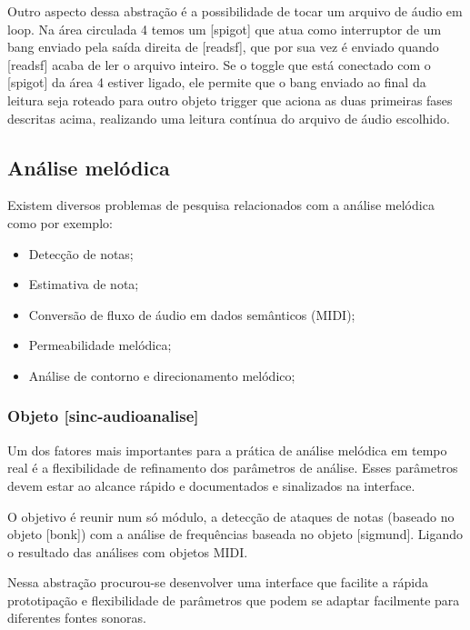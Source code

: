 \documentclass[draft]{ppgmus}
\begin{document}
Outro aspecto dessa abstração é a possibilidade de tocar um arquivo de áudio em loop.
Na área circulada 4 temos um [spigot] que atua como interruptor de um bang enviado pela
saída direita de [readsf\texttildelow], que por sua vez é enviado quando [readsf\texttildelow] 
acaba de ler o arquivo
inteiro. Se o toggle que está conectado com o [spigot] da área 4 estiver ligado, ele permite
que o bang enviado ao final da leitura seja roteado para outro objeto trigger que aciona as 
duas primeiras fases descritas acima, realizando uma leitura contínua do arquivo de áudio
escolhido.



\subsection{Análise melódica}


Existem diversos problemas de pesquisa relacionados com a
análise melódica como por exemplo:

\begin{itemize}
 \item Detecção de notas;
 \item Estimativa de nota;
 \item Conversão de fluxo de áudio em dados semânticos (MIDI);
 \item Permeabilidade melódica;
 \item Análise de contorno e direcionamento melódico;
\end{itemize}




\subsubsection{Objeto [sinc-audioanalise]}

Um dos fatores mais importantes para a prática de análise melódica
em tempo real é a flexibilidade de refinamento dos parâmetros
de análise. Esses parâmetros devem estar ao alcance rápido e documentados
e sinalizados na interface.

O objetivo é reunir num só módulo, a detecção de ataques de notas 
(baseado no objeto [bonk\texttildelow]) com a análise de frequências
baseada no objeto [sigmund\texttildelow]. Ligando o resultado das 
análises com objetos MIDI.

Nessa abstração procurou-se desenvolver uma interface que facilite
a rápida prototipação e flexibilidade de parâmetros que podem
se adaptar facilmente para diferentes fontes sonoras.
\end{document}
